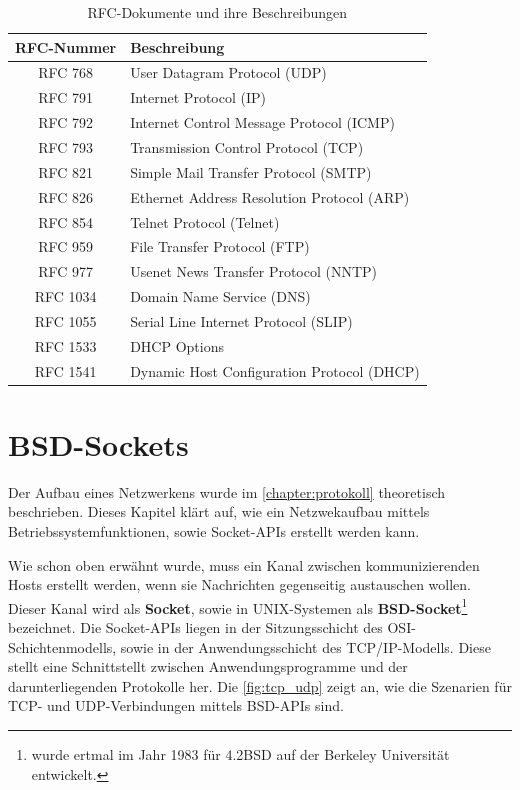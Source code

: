 \begin{table}[htbp]
	\centering
	\begin{tabular}{|c|l|}\hline
	   RFC-Nummer & Beschreibung\\ \hline \hline
	   RFC 768 & User Datagram Protocol (UDP) \\ \hline
	   RFC 791 & Internet Protocol (IP) \\ \hline
	   RFC 792 & Internet Control Message Protocol (ICMP) \\ \hline
	   RFC 793 & Transmission Control Protocol (TCP) \\ \hline	   
	   RFC 821 & Simple Mail Transfer Protocol (SMTP) \\ \hline
	   RFC 826 & Ethernet Address Resolution Protocol (ARP) \\ \hline
	   RFC 854 & Telnet Protocol (Telnet) \\ \hline
	   RFC 959 & File Transfer Protocol (FTP) \\ \hline
	   RFC 977 & Usenet News Transfer Protocol (NNTP) \\ \hline
	   RFC 1034 & Domain Name Service (DNS) \\ \hline
	   RFC 1055 & Serial Line Internet Protocol (SLIP) \\ \hline
	   RFC 1533 & DHCP Options \\ \hline
	   RFC 1541 & Dynamic Host Configuration Protocol (DHCP) \\ \hline
	 \end{tabular}
	 \caption{RFC-Dokumente und ihre Beschreibungen}\label{rfcs}
\end{table}

\section{BSD-Sockets}

Der Aufbau eines Netzwerkens wurde im \autoref{chapter:protokoll} theoretisch beschrieben. Dieses Kapitel klärt auf, wie ein Netzwekaufbau mittels Betriebssystemfunktionen, sowie Socket-APIs erstellt werden kann. \smallskip \smallskip

Wie schon oben erwähnt wurde, muss ein Kanal zwischen kommunizierenden Hosts erstellt werden, wenn sie Nachrichten gegenseitig austauschen wollen. Dieser Kanal wird als \textbf{Socket}, sowie in UNIX-Systemen als \textbf{BSD-Socket}\footnote{wurde ertmal im Jahr 1983 für 4.2BSD auf der Berkeley Universität entwickelt.} bezeichnet. Die Socket-APIs liegen in der Sitzungsschicht des OSI-Schichtenmodells, sowie in der Anwendungsschicht des TCP/IP-Modells. Diese stellt eine Schnittstellt zwischen Anwendungsprogramme und der darunterliegenden Protokolle her.  Die \autoref{fig:tcp_udp} zeigt an, wie die Szenarien für TCP- und UDP-Verbindungen mittels BSD-APIs  sind. 

